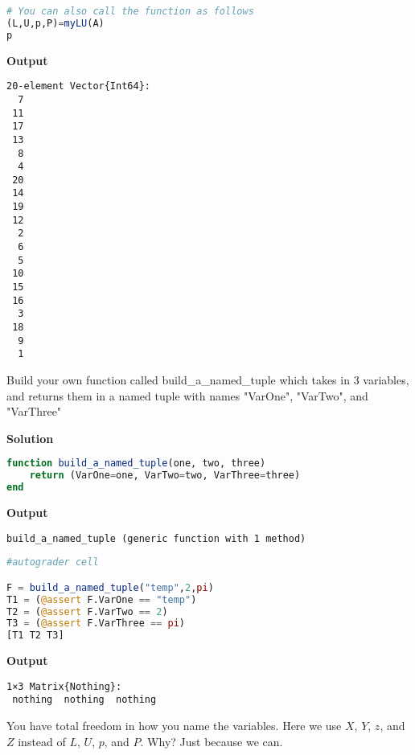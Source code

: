 \begin{lstlisting}[language=Julia,style=mystyle]
# You can also call the function as follows
(L,U,p,P)=myLU(A)
p
\end{lstlisting}
\textbf{Output} 
\begin{verbatim}
20-element Vector{Int64}:
  7
 11
 17
 13
  8
  4
 20
 14
 19
 12
  2
  6
  5
 10
 15
 16
  3
 18
  9
  1
\end{verbatim}


\begin{exercise}
Build your own function called build\_a\_named\_tuple which takes in 3 variables, and returns them in a named tuple with names "VarOne", "VarTwo", and "VarThree"
\end{exercise}

\textbf{Solution}

\begin{lstlisting}[language=Julia,style=mystyle]
function build_a_named_tuple(one, two, three)
    return (VarOne=one, VarTwo=two, VarThree=three)
end
\end{lstlisting}
\textbf{Output} 
\begin{verbatim}
build_a_named_tuple (generic function with 1 method)
\end{verbatim}


\begin{lstlisting}[language=Julia,style=mystyle]
#autograder cell

F = build_a_named_tuple("temp",2,pi)
T1 = (@assert F.VarOne == "temp")
T2 = (@assert F.VarTwo == 2)
T3 = (@assert F.VarThree == pi)
[T1 T2 T3]
\end{lstlisting}
\textbf{Output} 
\begin{verbatim}
1×3 Matrix{Nothing}:
 nothing  nothing  nothing
\end{verbatim}

\Qed

You have total freedom in how you name the variables. Here we use $X$, $Y$, $z$, and $Z$ instead of $L$, $U$, $p$, and $P$. Why? Just because we can.\\

